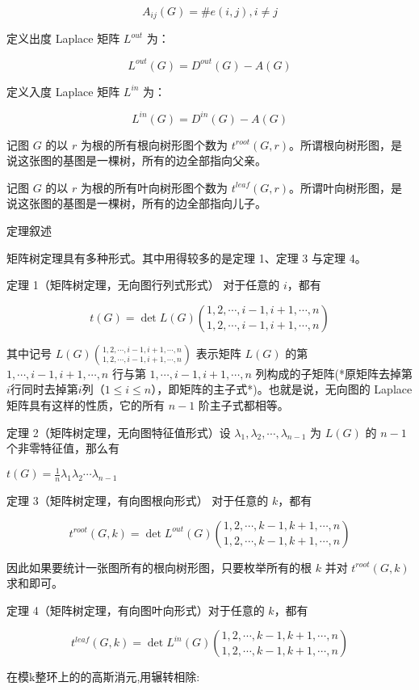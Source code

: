 \documentclass[UTF8]{ctexart}
\begin{document}
$$
A_{ij}(G)=\#e(i,j), i\neq j
$$

定义出度 Laplace 矩阵 $L^{out}$ 为：

$$
L^{out}(G) = D^{out}(G) - A(G)
$$

定义入度 Laplace 矩阵 $L^{in}$ 为：

$$
L^{in}(G) = D^{in}(G) - A(G)
$$

记图 $G$ 的以 $r$ 为根的所有根向树形图个数为 $t^{root}(G,r)$。所谓根向树形图，是说这张图的基图是一棵树，所有的边全部指向父亲。

记图 $G$ 的以 $r$ 为根的所有叶向树形图个数为 $t^{leaf}(G,r)$。所谓叶向树形图，是说这张图的基图是一棵树，所有的边全部指向儿子。

定理叙述

矩阵树定理具有多种形式。其中用得较多的是定理 1、定理 3 与定理 4。

定理 1（矩阵树定理，无向图行列式形式） 对于任意的 $i$，都有

$$
t(G) = \det L(G)\binom{1,2,\cdots,i-1,i+1,\cdots,n}{1,2,\cdots,i-1,i+1,\cdots,n}
$$

其中记号 $L(G)\binom{1,2,\cdots,i-1,i+1,\cdots,n}{1,2,\cdots,i-1,i+1,\cdots,n}$ 表示矩阵 $L(G)$ 的第 $1,\cdots,i-1,i+1,\cdots,n$ 行与第 $1,\cdots,i-1,i+1,\cdots,n$ 列构成的子矩阵(*原矩阵去掉第$i$行同时去掉第$i$列（$1\leq i\leq n$），即矩阵的主子式*)。也就是说，无向图的 Laplace 矩阵具有这样的性质，它的所有 $n-1$ 阶主子式都相等。

定理 2（矩阵树定理，无向图特征值形式）设 $\lambda_1, \lambda_2, \cdots, \lambda_{n-1}$ 为 $L(G)$ 的 $n - 1$ 个非零特征值，那么有

$t(G) = \frac{1}{n}\lambda_1\lambda_2\cdots\lambda_{n-1}$

定理 3（矩阵树定理，有向图根向形式） 对于任意的 $k$，都有

$$
t^{root}(G,k) = \det L^{out}(G)\binom{1,2,\cdots,k-1,k+1,\cdots,n}{1,2,\cdots,k-1,k+1,\cdots,n}
$$

因此如果要统计一张图所有的根向树形图，只要枚举所有的根 $k$ 并对 $t^{root}(G,k)$ 求和即可。

定理 4（矩阵树定理，有向图叶向形式）对于任意的 $k$，都有

$$
t^{leaf}(G,k) = \det L^{in}(G)\binom{1,2,\cdots,k-1,k+1,\cdots,n}{1,2,\cdots,k-1,k+1,\cdots,n}
$$


在模k整环上的的高斯消元,用辗转相除:
\end{document}
